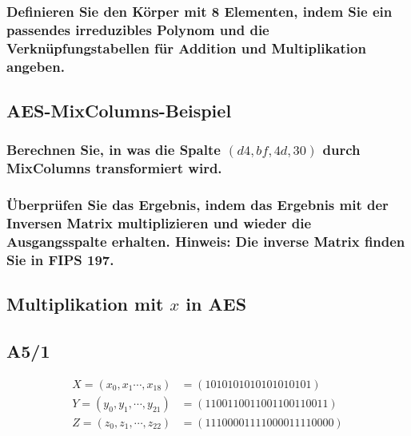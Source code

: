 \subsubsection{Definieren Sie den Körper mit 8 Elementen, indem Sie ein passendes
irreduzibles Polynom und die Verknüpfungstabellen für Addition und
Multiplikation angeben.}

\subsection{AES-MixColumns-Beispiel}
\subsubsection{Berechnen Sie, in was die Spalte $ (d4 , bf , 4d , 30 )$ durch MixColumns transformiert wird.}
\subsubsection{Überprüfen Sie das Ergebnis, indem das Ergebnis mit der Inversen Matrix
multiplizieren und wieder die Ausgangsspalte erhalten.
Hinweis: Die inverse Matrix finden Sie in FIPS 197.}


\subsection{Multiplikation mit $x$ in AES}

	

\subsection{A5/1}

\begin{align}
X = (x_0, x_1 \cdots , x_{18}) &= (1010101010101010101)    \\
Y = (y_0, y_1, \cdots , y_{21}) &= (1100110011001100110011) \\
Z = (z_0, z_1, \cdots , z_{22}) &= (11100001111000011110000)
\end{align}

\begin{algorithm}[H]
\end{algorithm}

